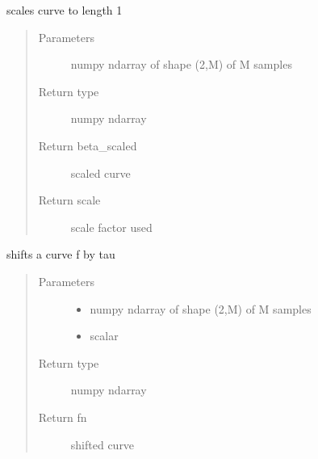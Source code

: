 \documentclass[letterpaper,10pt,english]{sphinxmanual}
\begin{document}

\begin{fulllineitems}
\label{\detokenize{curve_functions:curve_functions.scale_curve}}
scales curve to length 1
\begin{quote}\begin{description}
\item[{Parameters}] \leavevmode
{} \textendash{} numpy ndarray of shape (2,M) of M samples

\item[{Return type}] \leavevmode
numpy ndarray

\item[{Return beta\_scaled}] \leavevmode
scaled curve

\item[{Return scale}] \leavevmode
scale factor used

\end{description}\end{quote}

\end{fulllineitems}


\begin{fulllineitems}
\label{\detokenize{curve_functions:curve_functions.shift_f}}
shifts a curve f by tau
\begin{quote}\begin{description}
\item[{Parameters}] \leavevmode\begin{itemize}
\item {} 
 \textendash{} numpy ndarray of shape (2,M) of M samples

\item {} 
 \textendash{} scalar

\end{itemize}

\item[{Return type}] \leavevmode
numpy ndarray

\item[{Return fn}] \leavevmode
shifted curve

\end{description}\end{quote}

\end{fulllineitems}
\end{document}
